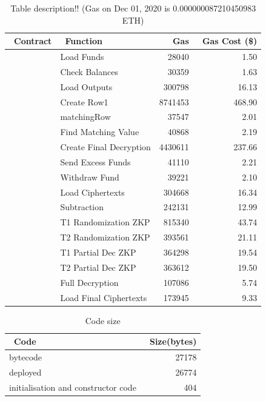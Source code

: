 \begin{table}[]
		\centering
	\begin{tabular}{|l|l|r|r|}
		\hline
		~\textbf{Contract} & ~\textbf{Function } & ~\textbf{Gas}  & ~\textbf{Gas Cost (\$)}  \\ \hline
		\multirow{9}{*}{}  
		& Load Funds & 28040  &1.50  \\ \cline{2-4} 
		& Check Balances &  30359& 1.63 \\  \cline{2-4} 
		&  Load Outputs&  300798 & 16.13 \\  \cline{2-4} 
		&  Create Row1 & 8741453 & 468.90 \\  \cline{2-4}
		Mixmatch.sol	&  matchingRow & 37547 &2.01  \\  \cline{2-4}
		& Find Matching Value &  40868&2.19 \\  \cline{2-4}
		&  Create Final Decryption&  4430611& 237.66 \\  \cline{2-4}
		& Send Excess Funds &  41110& 2.21 \\  \cline{2-4}
		& Withdraw Fund&  39221& 2.10 \\   \hline
		\multirow{8}{*}{} 
		&  Load Ciphertexts & 304668 & 16.34 \\  \cline{2-4}
		& Subtraction & 242131 & 12.99\\  \cline{2-4}
		&  T1 Randomization ZKP& 815340 &  43.74\\  \cline{2-4}
		PET.sol	&  T2 Randomization ZKP& 393561 &21.11  \\  \cline{2-4}
		& T1 Partial Dec ZKP& 364298 & 19.54\\  \cline{2-4}
		& T2 Partial Dec ZKP & 363612 & 19.50 \\  \cline{2-4}
		& Full Decryption  &  107086& 5.74 \\  \cline{2-4}
		&  Load Final Ciphertexts& 173945 & 9.33\\ \hline
	\end{tabular}
	\caption{Table description!! (Gas on Dec 01, 2020 is 0.000000087210450983 ETH)} \label{tab:gas}
\end{table}


\begin{table}[]
	\centering
	\begin{tabular}{|l|r|}
		\hline
		~\textbf{Code}	& ~\textbf{Size(bytes)}  \\ \hline
		bytecode	& 27178  \\ \hline
		deployed	& 26774  \\ \hline
		initialisation and constructor code 	& 404 \\ \hline
	\end{tabular}
	\caption{Code size}
\end{table}

